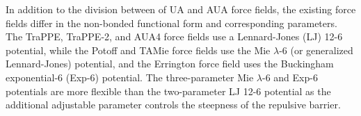 \documentclass[journal=jctc,manuscript=article]{achemso}
\begin{document}
%
%

In addition to the 
division between
of UA and AUA force fields, the existing force fields differ in the non-bonded functional form and corresponding parameters. The TraPPE, TraPPE-2, and AUA4 force fields use a Lennard-Jones (LJ) 12-6 potential, while the Potoff and TAMie force fields use the Mie $\lambda$-6 (or generalized Lennard-Jones) potential, and the Errington force field uses the Buckingham exponential-6 (Exp-6) potential. The three-parameter Mie $\lambda$-6 and Exp-6 potentials are more flexible than the two-parameter LJ 12-6 potential as the additional adjustable parameter controls the steepness of the repulsive barrier.

\end{document}
